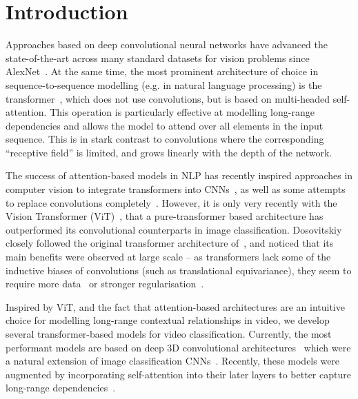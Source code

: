 \section{Introduction}


Approaches based on deep convolutional neural networks have advanced the state-of-the-art across many standard datasets for vision problems since AlexNet~\cite{krizhevsky_neurips_2012}.
At the same time, the most prominent architecture of choice in sequence-to-sequence modelling (e.g. in natural language processing) is the transformer~\cite{vaswani_neurips_2017}, which does not use convolutions, but is based on multi-headed self-attention.
This operation is particularly effective at modelling long-range dependencies and allows the model to attend over all elements in the input sequence.
This is in stark contrast to convolutions where the corresponding ``receptive field'' is limited, and grows linearly with the depth of the network.%


The success of attention-based models in NLP has recently inspired approaches in computer vision to integrate transformers into CNNs~\cite{wang_cvpr_2018, carion_eccv_2020}, as well as some attempts to replace convolutions completely~\cite{parmar_icml_2018, bello_iccv_2019, ramachandran_neurips_2019}. 
However, it is only very recently with the Vision Transformer (ViT)~\cite{dosovitskiy_iclr_2021}, that a pure-transformer based architecture has outperformed its convolutional counterparts in image classification.
Dosovitskiy~\etal~\cite{dosovitskiy_iclr_2021} closely followed the original transformer architecture of~\cite{vaswani_neurips_2017}, and noticed that its main benefits were observed at large scale -- as transformers lack some of the inductive biases of convolutions (such as translational equivariance), they seem to require more data~\cite{dosovitskiy_iclr_2021} or stronger regularisation~\cite{touvron_arxiv_2020}.


Inspired by ViT, and the fact that attention-based architectures are an intuitive choice for modelling long-range contextual relationships in video, we develop several transformer-based models for video classification.
Currently, the most performant models are based on deep 3D convolutional architectures~\cite{carreira_cvpr_2017, feichtenhofer_cvpr_2020, feichtenhofer_iccv_2019} which were a natural extension of image classification CNNs~\cite{he_cvpr_2016, szegedy_cvpr_2015}.
Recently, these models were augmented by incorporating self-attention into their later layers to better capture long-range dependencies~\cite{wang_cvpr_2018, girdhar_cvpr_2019, wu_cvpr_2019, arnab_graph_structured_iccv_2021}.

